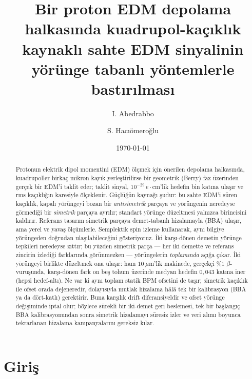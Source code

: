 \documentclass[aps,prab,reprint,superscriptaddress,nofootinbib]{revtex4-2}
\begin{document}
\title{Bir proton EDM depolama halkasında kuadrupol-kaçıklık kaynaklı sahte EDM
sinyalinin yörünge tabanlı yöntemlerle bastırılması}

\author{I. Abedrabbo}
\author{S. Hac{\i}\"omero\u{g}lu}

\date{\today}


\begin{abstract}
Protonun elektrik dipol momentini (EDM) ölçmek için önerilen depolama halkasında,
kuadrupoller birkaç mikron kayık yerleştirilirse bir geometrik (Berry) faz
üzerinden gerçek bir EDM'i taklit eder; taklit sinyal, $10^{-29}\,e\!\cdot\!$cm'lik
hedefin bin katına ulaşır ve rms kaçıklığın karesiyle ölçeklenir. Güçlüğün kaynağı
şudur: bu sahte EDM'i süren kaçıklık, kapalı yörüngeyi bozan bir \emph{antisimetrik}
parçaya ve yörüngenin neredeyse görmediği bir \emph{simetrik} parçaya ayrılır;
standart yörünge düzeltmesi yalnızca birincisini kaldırır. Referans tasarım simetrik
parçaya demet-tabanlı hizalamayla (BBA) ulaşır, ama yerel ve yavaş ölçümlerle.
Semplektik spin izleme kullanarak, aynı bilgiye yörüngeden doğrudan ulaşılabileceğini
gösteriyoruz. İki karşı-dönen demetin yörünge tepkileri neredeyse zıttır; bu yüzden
simetrik parça --- her iki demette ve referans zincirin izlediği farklarında
görünmezken --- yörüngelerin \emph{toplamında} açığa çıkar. İki yörüngeyi birlikte
düzeltmek ona ulaşır: ham $10~\mu$m'lik makinede, gerçekçi $\%1$ $\beta$-vuruşunda,
karşı-dönen fark on beş tohum üzerinde medyan hedefin $0{,}043$ katına iner (hepsi
hedef-altı). Ne var ki aynı toplam statik BPM ofsetini de taşır; simetrik kaçıklık
ile ofset orada dejeneredir, dolayısıyla mutlak hizalama hâlâ tek bir kalibrasyon
(BBA ya da dört-katlı) gerektirir. Buna karşılık drift diferansiyeldir ve ofset
yörünge değişiminde iptal olur; böylece sürekli bir iki-demet geri beslemesi, tek
bir başlangıç BBA kalibrasyonundan sonra simetrik hizalamayı süresiz izler ve veri
alımı boyunca tekrarlanan hizalama kampanyalarını gereksiz kılar.
\end{abstract}

\maketitle

\section{Giriş}
\label{sec:intro}
\end{document}
